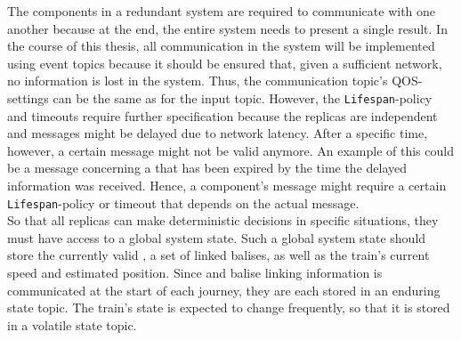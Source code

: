 \noindent
The components in a redundant system are required to communicate with one another because at the end, the entire system needs to present a single result.
In the course of this thesis, all communication in the system will be implemented using  event topics because it should be ensured that, given a sufficient network, no information is lost in the system.
Thus, the communication topic's \gls*{QOS}-settings can be the same as for the input topic.
However, the \texttt{Lifespan}-policy and timeouts require further specification because the replicas are independent and messages might be delayed due to network latency.
After a specific time, however, a certain message might not be valid anymore.
An example of this could be a message concerning a  that has been expired by the time the delayed information was received.
Hence, a component's message might require a certain \texttt{Lifespan}-policy or timeout that depends on the actual message.
\\

\noindent
So that all replicas can make deterministic decisions in specific situations, they must have access to a global system state.
Such a global system state should store the currently valid , a set of linked balises, as well as the train's current speed and estimated position.
Since  and balise linking information is communicated at the start of each journey, they are each stored in an enduring  state topic.
The train's state is expected to change frequently, so that it is stored in a volatile  state topic.